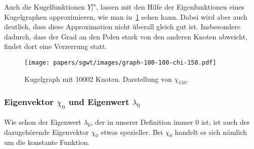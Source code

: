 Auch die Kugelfunktionen $Y^m_l$, lassen mit den Hilfe der 
Eigenfunktionen eines Kugelgraphen approximieren, wie man 
in~\cref{fig:sgwt:chi:sphere} sehen kann. Dabei wird aber auch deutlich, dass 
diese Approximation nicht \"uberall gleich gut ist. Insbesondere dadurch, dass 
der Grad an den Polen stark von den anderen Knoten abweicht, findet dort eine 
Verzerrung statt.
\begin{figure}
    \centering
    \texttt{[image: papers/sgwt/images/graph-100-100-chi-150.pdf]}
    \vspace{-80pt}
    \caption{Kugelgraph mit 10002 Knoten. Darstellung von $\chi_{150}$.
        \label{fig:sgwt:chi:sphere}}
\end{figure}

\subsubsection{Eigenvektor \texorpdfstring{$\chi_0$}{chi 0} und 
Eigenwert \texorpdfstring{$\lambda_0$}{lambda 0}}
Wie schon der Eigenwert $\lambda_0$, der in unserer Definition immer $0$ ist, 
ist auch der dazugeh\"orende Eigenvektor $\chi_0$ etwas spezieller. Bei 
$\chi_0$ handelt es sich n\"amlich um die konstante Funktion.

